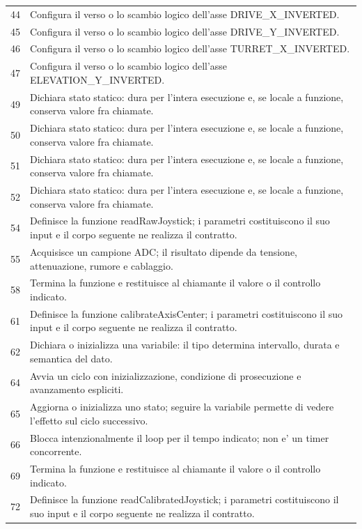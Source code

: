\documentclass[11pt,a4paper]{article}
\begin{document}
\begin{longtable}{p{}p{}}
44 & Configura il verso o lo scambio logico dell'asse DRIVE\_\allowbreak{}X\_\allowbreak{}INVERTED. \\
45 & Configura il verso o lo scambio logico dell'asse DRIVE\_\allowbreak{}Y\_\allowbreak{}INVERTED. \\
46 & Configura il verso o lo scambio logico dell'asse TURRET\_\allowbreak{}X\_\allowbreak{}INVERTED. \\
47 & Configura il verso o lo scambio logico dell'asse ELEVATION\_\allowbreak{}Y\_\allowbreak{}INVERTED. \\
49 & Dichiara stato statico: dura per l'intera esecuzione e, se locale a funzione, conserva valore fra chiamate. \\
50 & Dichiara stato statico: dura per l'intera esecuzione e, se locale a funzione, conserva valore fra chiamate. \\
51 & Dichiara stato statico: dura per l'intera esecuzione e, se locale a funzione, conserva valore fra chiamate. \\
52 & Dichiara stato statico: dura per l'intera esecuzione e, se locale a funzione, conserva valore fra chiamate. \\
54 & Definisce la funzione readRawJoystick; i parametri costituiscono il suo input e il corpo seguente ne realizza il contratto. \\
55 & Acquisisce un campione ADC; il risultato dipende da tensione, attenuazione, rumore e cablaggio. \\
58 & Termina la funzione e restituisce al chiamante il valore o il controllo indicato. \\
61 & Definisce la funzione calibrateAxisCenter; i parametri costituiscono il suo input e il corpo seguente ne realizza il contratto. \\
62 & Dichiara o inizializza una variabile: il tipo determina intervallo, durata e semantica del dato. \\
64 & Avvia un ciclo con inizializzazione, condizione di prosecuzione e avanzamento espliciti. \\
65 & Aggiorna o inizializza uno stato; seguire la variabile permette di vedere l'effetto sul ciclo successivo. \\
66 & Blocca intenzionalmente il loop per il tempo indicato; non e' un timer concorrente. \\
69 & Termina la funzione e restituisce al chiamante il valore o il controllo indicato. \\
72 & Definisce la funzione readCalibratedJoystick; i parametri costituiscono il suo input e il corpo seguente ne realizza il contratto. \\

\end{longtable}
\end{document}
